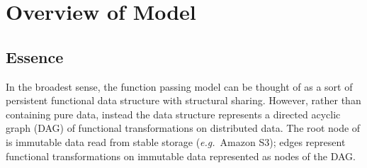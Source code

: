 \documentclass{jfp1}
\newcommand\eg{\emph{e.g.}\ }
\begin{document}


%
%
%
%
%
%
%

\section{Overview of Model}
\label{sec:basic-model}

\subsection{Essence}

In the broadest sense, the function passing model can be thought of as a sort of
persistent functional data structure with structural sharing. However, rather
than containing pure data, instead the data structure represents a directed
acyclic graph (DAG) of functional transformations on distributed data. The root
node of is immutable data read from stable storage (\eg Amazon S3); edges
represent functional transformations on immutable data represented as nodes of
the DAG.
\end{document}

